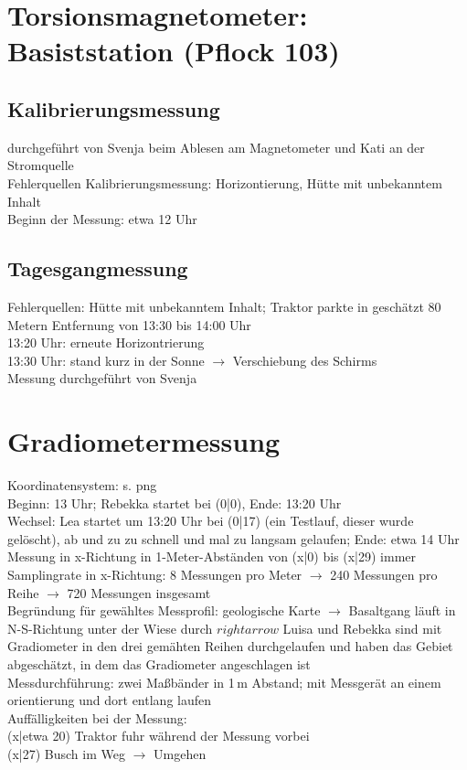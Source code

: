 \documentclass[a4paper,10pt]{article}
\date{22.05.2018}
\numberwithin{equation}{section}
\begin{document}
\section{Torsionsmagnetometer: Basiststation (Pflock 103)}


\subsection{Kalibrierungsmessung}
durchgeführt von Svenja beim Ablesen am Magnetometer und Kati an der Stromquelle \\
Fehlerquellen Kalibrierungsmessung: Horizontierung, Hütte mit unbekanntem Inhalt \\
Beginn der Messung: etwa 12 Uhr \\

\subsection{Tagesgangmessung}
Fehlerquellen: Hütte mit unbekanntem Inhalt; Traktor parkte in geschätzt 80 Metern Entfernung von 13:30 bis 14:00 Uhr \\
13:20 Uhr: erneute Horizontrierung \\
13:30 Uhr: stand kurz in der Sonne $\rightarrow$ Verschiebung des Schirms \\
Messung durchgeführt von Svenja


\section{Gradiometermessung}
Koordinatensystem: s. png \\
Beginn: 13 Uhr; Rebekka startet bei (0|0), Ende: 13:20 Uhr \\
Wechsel: Lea startet um 13:20 Uhr bei (0|17) (ein Testlauf, dieser wurde gelöscht), ab und zu zu schnell und mal zu langsam gelaufen; Ende: etwa 14 Uhr \\
Messung in x-Richtung in 1-Meter-Abständen von (x|0) bis (x|29) immer \\
Samplingrate in x-Richtung: 8 Messungen pro Meter $\rightarrow$ 240 Messungen pro Reihe $\rightarrow$ 720 Messungen  insgesamt \\
Begründung für gewähltes Messprofil: geologische Karte $\rightarrow$ Basaltgang läuft in N-S-Richtung unter der Wiese durch $rightarrow$ Luisa und Rebekka sind mit Gradiometer in den drei gemähten Reihen durchgelaufen und haben das Gebiet abgeschätzt, in dem das Gradiometer angeschlagen ist \\
Messdurchführung: zwei Maßbänder in 1\,m Abstand; mit Messgerät an einem orientierung und dort entlang laufen \\
Auffälligkeiten bei der Messung: \\
(x|etwa 20) Traktor fuhr während der Messung vorbei \\
(x|27) Busch im Weg $\rightarrow$ Umgehen \\
\end{document}
